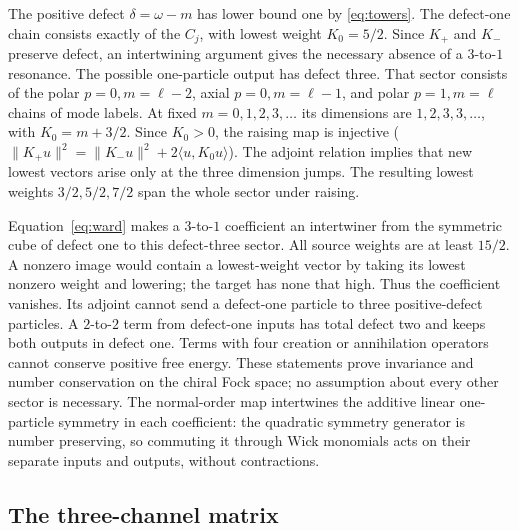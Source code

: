 \documentclass[11pt]{article}
\numberwithin{equation}{section}
\begin{document}
The positive defect \(\delta=\omega-m\) has lower bound one
by \eqref{eq:towers}. The defect-one chain consists exactly
of the \(C_j\), with lowest weight \(K_0=5/2\).
Since \(K_+\) and \(K_-\) preserve defect, an intertwining
argument gives the necessary absence of a \(3\)-to-\(1\)
resonance. The possible one-particle output has defect three.
That sector consists of the polar \(p=0,m=\ell-2\), axial
\(p=0,m=\ell-1\), and polar \(p=1,m=\ell\) chains of
mode labels. At fixed \(m=0,1,2,3,\ldots\) its dimensions are
\(1,2,3,3,\ldots\), with \(K_0=m+3/2\).
Since \(K_0>0\), the raising map is injective
(\(\|K_+u\|^2=\|K_-u\|^2+2\langle u,K_0u\rangle\)).
The adjoint relation implies that new lowest vectors arise
only at the three dimension jumps. The resulting lowest
weights \(3/2,5/2,7/2\) span the whole sector under raising.

Equation~\eqref{eq:ward} makes a \(3\)-to-\(1\) coefficient an
intertwiner from the symmetric cube of defect one to this
defect-three sector. All source weights are at least \(15/2\).
A nonzero image would contain a lowest-weight vector
by taking its lowest nonzero weight and lowering; the target
has none that high. Thus the coefficient vanishes. Its adjoint
cannot send a defect-one particle to three positive-defect
particles. A \(2\)-to-\(2\) term from defect-one inputs has
total defect two and keeps both outputs in defect one. Terms
with four creation or annihilation operators cannot conserve
positive free energy. These statements prove invariance and
number conservation on the chiral Fock space; no assumption
about every other sector is necessary. The normal-order map
intertwines the additive linear one-particle symmetry in
each coefficient: the quadratic symmetry generator is
number preserving, so commuting it through Wick monomials
acts on their separate inputs and outputs, without contractions.

\subsection{The three-channel matrix}
\end{document}
